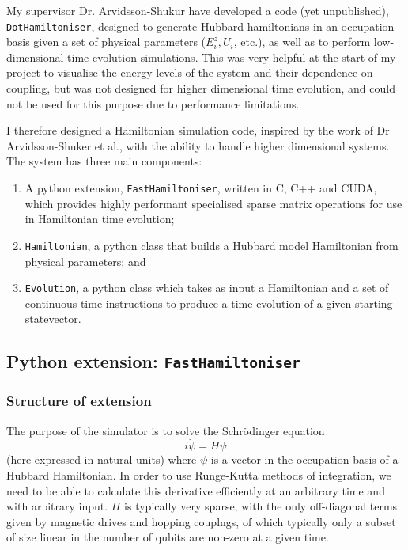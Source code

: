 \documentclass{report}
\begin{document}
My supervisor Dr. Arvidsson-Shukur have developed a code (yet unpublished), \texttt{DotHamiltoniser}, designed to generate Hubbard hamiltonians in an occupation basis given a set of physical parameters ($E_i^z, U_i$, etc.), as well as to perform low-dimensional time-evolution simulations. This was very helpful at the start of my project to visualise the energy levels of the system and their dependence on coupling, but was not designed for higher dimensional time evolution, and could not be used for this purpose due to performance limitations.

I therefore designed a Hamiltonian simulation code, inspired by the work of Dr Arvidsson-Shuker et al., with the ability to handle higher dimensional systems. The system has three main components: 
\begin{enumerate}
    \item A python extension, \texttt{FastHamiltoniser}, written in C, C++ and CUDA, which provides highly performant specialised sparse matrix operations for use in Hamiltonian time evolution;
    \item \texttt{Hamiltonian}, a python class that builds a Hubbard model Hamiltonian from physical parameters; and
    \item \texttt{Evolution}, a python class which takes as input a Hamiltonian and a set of continuous time instructions to produce a time evolution of a given starting statevector.
\end{enumerate}
\subsection{Python extension: \texttt{FastHamiltoniser}}
\subsubsection{Structure of extension}
The purpose of the simulator is to solve the Schrödinger equation
\begin{equation*}
    i\dot{\psi} = H \psi 
\end{equation*} (here expressed in natural units) where $\psi$ is a vector in the occupation basis of a Hubbard Hamiltonian. In order to use Runge-Kutta \cite{Butcher1996} methods of integration, we need to be able to calculate this derivative efficiently at an arbitrary time and with arbitrary input. $H$ is typically very sparse, with the only off-diagonal terms given by magnetic drives and hopping couplngs, of which typically only a subset of size linear in the number of qubits are non-zero at a given time. 
\end{document}
